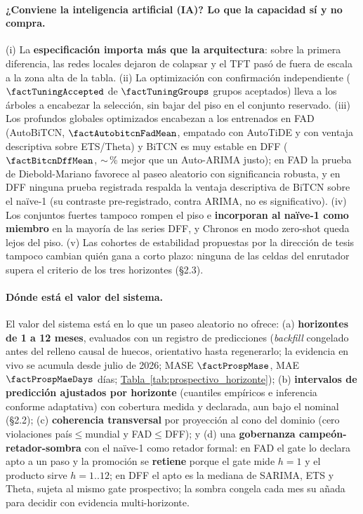 \documentclass[12pt,letterpaper]{report}
\begin{document}
\paragraph{¿Conviene la inteligencia artificial (IA)? Lo que la capacidad sí y no compra.} (i) La \textbf{especificación
importa más que la arquitectura}: sobre la primera diferencia, las redes locales dejaron de
colapsar y el TFT pasó de fuera de escala a la zona alta de la tabla. (ii) La optimización con
confirmación independiente ($\factTuningAccepted$ de $\factTuningGroups$ grupos aceptados) lleva
a los árboles a encabezar la selección, sin bajar del piso en el conjunto reservado. (iii) Los
profundos globales optimizados encabezan a los entrenados en FAD (AutoBiTCN,
$\factAutobitcnFadMean$, empatado con AutoTiDE y con ventaja descriptiva sobre ETS/Theta) y
BiTCN es muy estable en DFF ($\factBitcnDffMean$, $\sim$\factDeepDffMarginPct\,\% mejor que un
Auto-ARIMA justo); en FAD la prueba de Diebold-Mariano favorece al paseo aleatorio con
significancia robusta, y en DFF ninguna prueba registrada respalda la ventaja descriptiva de
BiTCN sobre el naïve-1 (su contraste pre-registrado, contra ARIMA, no es significativo). (iv)
Los conjuntos fuertes tampoco rompen el piso e \textbf{incorporan al naïve-1 como miembro} en la
mayoría de las series DFF, y Chronos en modo zero-shot queda lejos del piso. (v) Las
cohortes de estabilidad propuestas por la dirección de tesis tampoco cambian quién gana a corto
plazo: ninguna de las \cohortFactRouterCeldas{} celdas del enrutador supera el criterio de los
tres horizontes (§2.3).

\paragraph{Dónde está el valor del sistema.} El valor del sistema está en lo que un paseo
aleatorio no ofrece: (a) \textbf{horizontes de 1 a 12 meses}, evaluados con un registro de
\factProspNScoredFmt{} predicciones (\textit{backfill} congelado antes del relleno causal de huecos,
orientativo hasta regenerarlo; la evidencia en vivo se acumula desde julio de 2026; MASE $\factProspMase$, MAE
$\factProspMaeDays$ días; \hyperref[tab:prospectivo_horizonte]{Tabla~\ref*{tab:prospectivo_horizonte}}); (b) \textbf{intervalos de
predicción ajustados por horizonte} (cuantiles empíricos e inferencia conforme adaptativa) con
cobertura medida y declarada, aun bajo el nominal (§2.2); (c)
\textbf{coherencia transversal} por proyección al cono del dominio (cero violaciones
país$\leq$mundial y FAD$\leq$DFF); y (d) una \textbf{gobernanza campeón-retador-sombra} con el
naïve-1 como retador formal: en FAD el gate lo declara apto a un paso y la promoción se
\textbf{retiene} porque el gate mide $h=1$ y el producto sirve $h=1..12$; en DFF el apto es la
mediana de SARIMA, ETS y Theta, sujeta al mismo gate prospectivo; la sombra congela cada mes su
añada para decidir con evidencia multi-horizonte.
\end{document}
